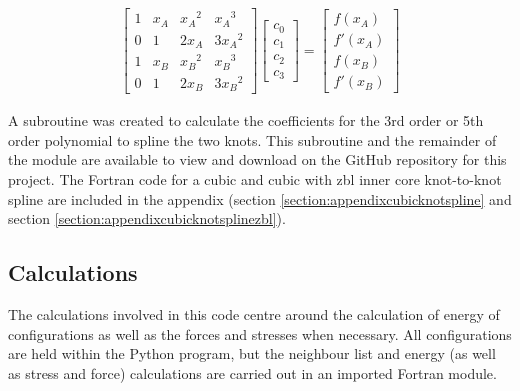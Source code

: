 \begin{equation}
  \begin{split}
    \begin{bmatrix}
    1  &  x_A  &  {x_A}^2  &  {x_A}^3     \\
    0  &  1    &  2 x_A    &  3 {x_A}^2   \\
    1  &  x_B  &  {x_B}^2  &  {x_B}^3     \\
    0  &  1    &  2 x_B    &  3 {x_B}^2
    \end{bmatrix}
    \begin{bmatrix}
    c_0 \\
    c_1 \\ 
    c_2 \\ 
    c_3
    \end{bmatrix}
    = 
    \begin{bmatrix}
    f(x_A) \\
    f'(x_A) \\ 
    f(x_B) \\ 
    f'(x_B)
    \end{bmatrix}
  \end{split}
  \label{eq:eqSplineThreeMatrix}
\end{equation}


A subroutine was created to calculate the coefficients for the 3rd order or 5th order polynomial to spline the two knots.  This subroutine and the remainder of the module are available to view and download on the GitHub repository for this project.  The Fortran code for a cubic and cubic with \acrshort{zbl} inner core knot-to-knot spline are included in the appendix (section \ref{section:appendixcubicknotspline} and section \ref{section:appendixcubicknotsplinezbl}).








\subsection{Calculations}

The calculations involved in this code centre around the calculation of energy of configurations as well as the forces and stresses when necessary.  All configurations are held within the Python program, but the neighbour list and energy (as well as stress and force) calculations are carried out in an imported Fortran module.

